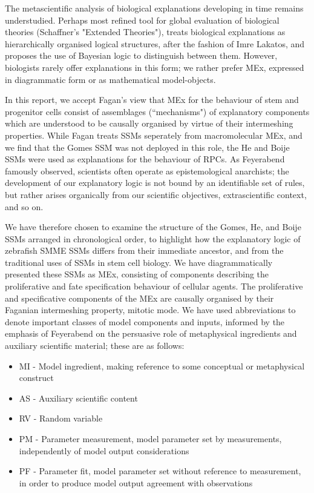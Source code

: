 The metascientific analysis of biological explanations developing in time remains understudied. Perhaps most refined tool for global evaluation of biological theories (Schaffner's "Extended Theories"), treats biological explanations as hierarchically organised logical structures, after the fashion of Imre Lakatos, and proposes the use of Bayesian logic to distinguish between them\cite{Schaffner1993}. However, biologists rarely offer explanations in this form; we rather prefer MEx, expressed in diagrammatic form or as mathematical model-objects.

In this report, we accept Fagan's view that MEx for the behaviour of stem and progenitor cells consist of assemblages (``mechanisms") of explanatory components which are understood to be causally organised by virtue of their intermeshing properties\cite{Fagan2015}. While Fagan treats SSMs seperately from macromolecular MEx, and we find that the Gomes SSM was not deployed in this role, the He and Boije SSMs were used as explanations for the behaviour of RPCs. As Feyerabend famously observed, scientists often operate as epistemological anarchists; the development of our explanatory logic is not bound by an identifiable set of rules, but rather arises organically from our scientific objectives, extrascientific context, and so on\cite{Feyerabend1993}.
 
We have therefore chosen to examine the structure of the Gomes, He, and Boije SSMs arranged in chronological order, to highlight how the explanatory logic of zebrafish SMME SSMs differs from their immediate ancestor, and from the traditional uses of SSMs in stem cell biology. We have diagrammatically presented these SSMs as MEx, consisting of components describing the proliferative and fate specification behaviour of cellular agents. The proliferative and specificative components of the MEx are causally organised by their Faganian intermeshing property, mitotic mode. We have used abbreviations to denote important classes of model components and inputs, informed by the emphasis of Feyerabend on the persuasive role of metaphysical ingredients and auxiliary scientific material; these are as follows:

 \begin{itemize}
	\item{MI - Model ingredient, making reference to some conceptual or metaphysical construct}
	\item{AS - Auxiliary scientific content}
	\item{RV - Random variable}
	\item{PM - Parameter measurement, model parameter set by measurements, independently of model output considerations}
	\item{PF - Parameter fit, model parameter set without reference to measurement, in order to produce model output agreement with observations}
\end{itemize}

